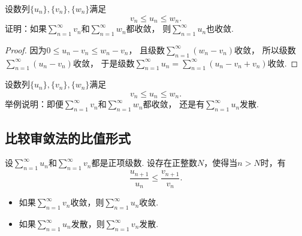 \begin{example}
设数列\(\{u_n\},\{v_n\},\{w_n\}\)满足\[
	v_n \leq u_n \leq w_n.
\]
证明：如果\(\sum_{n=1}^\infty v_n\)和\(\sum_{n=1}^\infty w_n\)都收敛，
则\(\sum_{n=1}^\infty u_n\)也收敛.
\begin{proof}
因为\(0 \leq u_n - v_n \leq w_n - v_n\)，
且级数\(\sum_{n=1}^\infty (w_n - v_n)\)收敛，
所以级数\(\sum_{n=1}^\infty (u_n - v_n)\)收敛，
于是级数\(\sum_{n=1}^\infty u_n
= \sum_{n=1}^\infty (u_n - v_n + v_n)\)收敛.
\end{proof}
\end{example}

\begin{example}
设数列\(\{u_n\},\{v_n\},\{w_n\}\)满足\[
	v_n \leq u_n \leq w_n.
\]
举例说明：即便\(\sum_{n=1}^\infty v_n\)和\(\sum_{n=1}^\infty w_n\)都收敛，
还是有\(\sum_{n=1}^\infty u_n\)发散.
\end{example}

\subsection{比较审敛法的比值形式}
\begin{theorem}\label{theorem:无穷级数.比较审敛法的比值形式}
设\(\sum_{n=1}^\infty u_n\)和\(\sum_{n=1}^\infty v_n\)都是正项级数.
设存在正整数\(N\)，使得当\(n>N\)时，有\[
	\frac{u_{n+1}}{u_n} \leq \frac{v_{n+1}}{v_n}.
\]
\begin{itemize}
	\item 如果\(\sum_{n=1}^\infty v_n\)收敛，则\(\sum_{n=1}^\infty u_n\)收敛.
	\item 如果\(\sum_{n=1}^\infty u_n\)发散，则\(\sum_{n=1}^\infty v_n\)发散.
\end{itemize}
\end{theorem}

